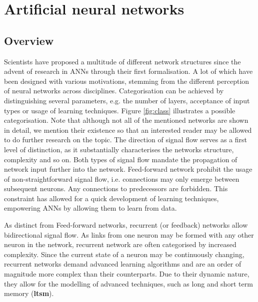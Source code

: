 \documentclass[10pt,a4paper,DIV=11]{scrreprt}
\begin{document}
\chapter{Artificial neural networks}
\label{ch:ann}
\section{Overview}

Scientists have proposed a multitude of different network structures since the advent of research in ANNs through their first formalisation. 
A lot of which have been designed with various motivations, stemming from the different perception of neural networks across disciplines.
Categorisation can be achieved by distinguishing several parameters, e.g. the number of layers, acceptance of input types or usage of learning techniques.
Figure \ref{fig:class} illustrates a possible categorisation\cite{NNGER}. Note that although not all of the mentioned networks are shown in detail,
we mention their existence so that an interested reader may be allowed to do further research on the topic.
The direction of signal flow serves as a first level of distinction, as it substantially characterises the networks structure, complexity and so on.
Both types of signal flow mandate the propagation of network input further into the network.
Feed-forward network prohibit the usage of non-straightforward signal flow, i.e. connections may only emerge between subsequent neurons.
Any connections to predecessors are forbidden. This constraint has allowed for a quick development of learning techniques, empowering ANNs by 
allowing them to learn from data. 

As distinct from Feed-forward networks, recurrent (or feedback) networks allow bidirectional signal flow. 
As links from one neuron may be formed with any other neuron in the network, recurrent network are often categorised by increased complexity.
Since the current state of a neuron may be continuously changing, recurrent networks demand advanced learning algorithms and are an order of magnitude
more complex than their counterparts.  Due to their dynamic nature, they allow for the modelling of advanced techniques, 
such as long and short term memory \cite{LTSM} (\textbf{ltsm}).
\end{document}
